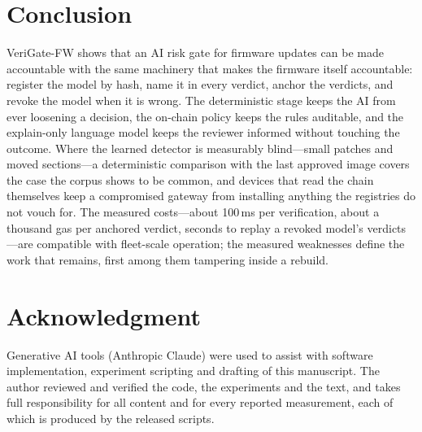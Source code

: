 \documentclass[conference]{IEEEtran}
\newcommand{\sys}{VeriGate-FW}
\begin{document}
\section{Conclusion}
\sys{} shows that an AI risk gate for firmware updates can be made accountable with the same
machinery that makes the firmware itself accountable: register the model by hash, name it in
every verdict, anchor the verdicts, and revoke the model when it is wrong. The deterministic
stage keeps the AI from ever loosening a decision, the on-chain policy keeps the rules auditable,
and the explain-only language model keeps the reviewer informed without touching the outcome.
Where the learned detector is measurably blind---small patches and moved sections---a
deterministic comparison with the last approved image covers the case the corpus shows to be
common, and devices that read the chain themselves keep a compromised gateway from installing
anything the registries do not vouch for. The measured costs---about 100\,ms per verification,
about a thousand gas per anchored verdict, seconds to replay a revoked model's verdicts---are
compatible with fleet-scale operation; the measured weaknesses define the work that remains,
first among them tampering inside a rebuild.

\section*{Acknowledgment}
Generative AI tools (Anthropic Claude) were used to assist with software implementation,
experiment scripting and drafting of this manuscript. The author reviewed and verified the code,
the experiments and the text, and takes full responsibility for all content and for every
reported measurement, each of which is produced by the released scripts.
\end{document}
